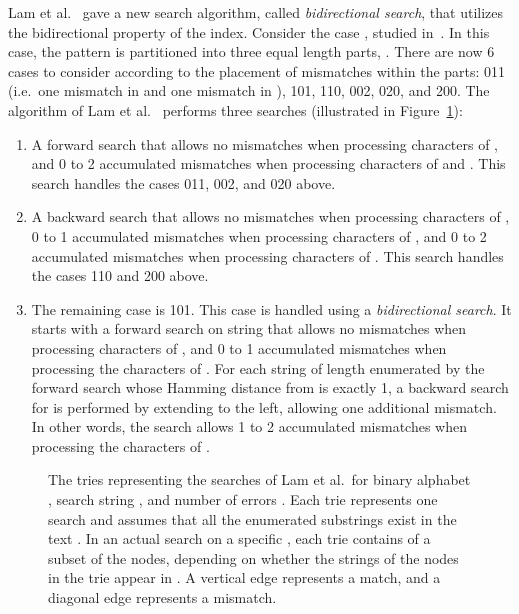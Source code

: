 \documentclass[12pt]{article}
\begin{document}
Lam et al.~\cite{LamLTWWY09} gave a new search algorithm, called
\emph{bidirectional search}, that utilizes the bidirectional property
of the index.
Consider the case , studied in~\cite{LamLTWWY09}.
In this case, the pattern is partitioned into three equal length parts,
.
There are now 6 cases to consider according to the placement of mismatches
within the parts:
011 (i.e.\ one mismatch in  and one mismatch in ),
101, 110, 002, 020, and 200.
The algorithm of Lam et al.~\cite{LamLTWWY09} performs three searches
(illustrated in Figure~\ref{fig:tries}):
\begin{enumerate}
\item A forward search that allows no mismatches when processing
characters of , and 0 to 2 accumulated mismatches when processing 
characters of  and .
This search handles the cases 011, 002, and 020 above.
\item
A backward search that allows no mismatches when processing characters
of ,
0 to 1 accumulated mismatches when processing characters of , and
0 to 2 accumulated mismatches when processing characters of .
This search handles the cases 110 and 200 above.
\item
The remaining case is 101.
This case is handled using a \emph{bidirectional search}.
It starts with a forward search on string  that
allows no mismatches when processing characters of , and
0 to 1 accumulated mismatches when processing the characters of .
For each string  of length  enumerated by the forward search whose
Hamming distance from  is exactly 1, a backward search for  is performed
by extending  to the left, 
allowing one additional mismatch.
In other words, the search allows 1 to 2 accumulated mismatches when processing the
characters of .
\end{enumerate}
\begin{figure}
\centering
{}
\caption{The tries representing the searches of Lam et al.\ for binary
alphabet , search string ,
and number of errors .
Each trie represents one search and assumes that all the enumerated substrings exist in the text .
In an actual search on a specific , each trie contains of a subset of
the nodes, depending on whether the strings of the nodes in the trie appear
in .
A vertical edge represents a match, and a diagonal edge represents a mismatch.
\label{fig:tries}}
\end{figure}
\end{document}
